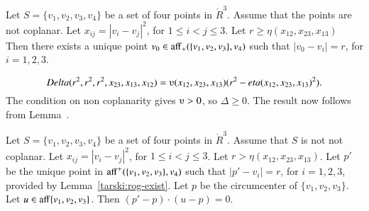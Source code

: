 \begin{tarskidata}
\begin{tarski}

\begin{lemma}
Let $S=\{v_1,v_2,v_3,v_4\}$ be a set of four points
in $\ring{R}^3$.  Assume that the points are not coplanar.
Let $x_{ij} = |v_i-v_j|^2$, for $1\le i < j\le 3$.
Let $r\ge \eta(x_{12},x_{23},x_{13})$ 
Then there exists a unique point $v_0\in{\operatorname{aff}}_+(\{v_1,v_2,v_3\},v_4)$
such that
   $|v_0-v_i| = r$, for $i=1,2,3$.
\end{lemma}

\begin{proved}
$$\Delta(r^2,r^2,r^2,x_{23},x_{13},x_{12})=
   \ups(x_{12},x_{23},x_{13}) (r^2-\eta(x_{12},x_{23},x_{13})^2).$$
The condition on non coplanarity gives $\ups>0$, so
$\Delta\ge0$.  The result now follows from Lemma~. 
\swallowed\end{proved}

%
\end{tarski}







\begin{tarski}

\begin{lemma}
Let $S=\{v_1,v_2,v_3,v_4\}$ be a set of four points
in $\ring{R}^3$.  Assume that $S$ is not not coplanar.
Let $x_{ij} = |v_i-v_j|^2$, for $1\le i < j\le 3$.
Let $r > \eta(x_{12},x_{23},x_{13})$.
Let $p'$ be the unique point in
${\operatorname{aff}}^+(\{v_1,v_2,v_3\},v_4)$
such that
   $|p'-v_i| = r$, for $i=1,2,3$, provided by Lemma~\ref{tarski:rog-exist}.
Let $p$ be the circumcenter of $\{v_1,v_2,v_3\}$.  Let 
$u\in {\operatorname{aff}}\{v_1,v_2,v_3\}$.  Then
  $(p'-p)\cdot (u-p)=0$.
\end{lemma}


\end{tarski}
\end{tarskidata}
